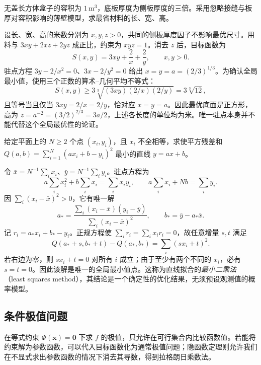 \documentclass[UTF8,12pt,a4paper,fontset=fandol]{ctexbook}
\begin{document}
\begin{example}
\label{ex:open-box-material-minimum-ch14}
无盖长方体盒子的容积为 $1\,\mathrm m^3$，底板厚度为侧板厚度的三倍。采用忽略接缝与板厚对容积影响的薄壁模型，求最省材料的长、宽、高。
\end{example}
\begin{solve}
设长、宽、高的米数分别为 $x,y,z>0$，共同的侧板厚度因子不影响最优尺寸。用料与 $3xy+2xz+2yz$ 成正比，约束为 $xyz=1$。消去 $z$ 后，目标函数为
\[
    S(x,y)=3xy+\frac2x+\frac2y,\qquad x,y>0.
\]
驻点方程 $3y-2/x^2=0$、$3x-2/y^2=0$ 给出 $x=y=a=(2/3)^{1/3}$。为确认全局最小值，使用三个正数的算术--几何平均不等式：
\[
    S(x,y)\geq3\sqrt[3]{(3xy)(2/x)(2/y)}=3\sqrt[3]{12},
\]
且等号当且仅当 $3xy=2/x=2/y$，恰对应 $x=y=a$。因此最优底面是正方形，高为 $z=a^{-2}=(3/2)^{2/3}=3a/2$，上述各长度的单位均为米。唯一驻点本身并不能代替这个全局最优性的论证。
\end{solve}

\begin{example}
\label{ex:least-squares-line-ch14}
给定平面上的 $N\geq2$ 个点 $(x_i,y_i)$，且 $x_i$ 不全相等，求使平方残差和 $Q(a,b)=\sum_{i=1}^N(ax_i+b-y_i)^2$ 最小的直线 $y=ax+b$。
\end{example}
\begin{solve}
令 $\bar x=N^{-1}\sum_i x_i$、$\bar y=N^{-1}\sum_i y_i$。驻点方程为
\[
    a\sum_i x_i^2+b\sum_i x_i=\sum_i x_iy_i,\qquad
    a\sum_i x_i+Nb=\sum_i y_i.
\]
因 $\sum_i(x_i-\bar x)^2>0$，它有唯一解
\[
    a_* =\frac{\sum_i(x_i-\bar x)(y_i-\bar y)}{\sum_i(x_i-\bar x)^2},
    \qquad b_* =\bar y-a_*\bar x.
\]
记 $r_i=a_*x_i+b_*-y_i$。正规方程使 $\sum_i r_i=\sum_i x_ir_i=0$，故任意增量 $s,t$ 满足
\[
    Q(a_*+s,b_*+t)-Q(a_*,b_*)=\sum_i(sx_i+t)^2.
\]
若右边为零，则 $sx_i+t=0$ 对所有 $i$ 成立；由于至少有两个不同的 $x_i$，必有 $s=t=0$。因此该解是唯一的全局最小值点。这称为直线拟合的\emph{最小二乘法}（least squares method），其结论是一个确定性的优化结果，无须预设观测值的概率模型。
\end{solve}

\subsection{条件极值问题}
\label{subsec:constrained-extrema}

在等式约束 $\Phi(\boldsymbol x)=\boldsymbol0$ 下求 $f$ 的极值，只允许在可行集合内比较函数值。若能将约束解为参数函数，可以代入目标函数化为通常极值问题；隐函数定理则允许我们在不显式求出参数函数的情况下消去其导数，得到拉格朗日乘数法。
\end{document}
